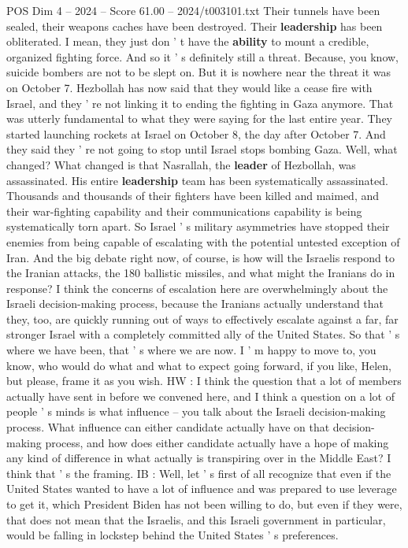 \begin{textsample}{POS Dim 4 – 2024 – Score 61.00 – 2024/t003101.txt}
Their tunnels have been sealed, their weapons caches have been destroyed.
Their \textbf{leadership} has been obliterated.
I mean, they just don ' t have the \textbf{ability} to mount a credible, organized fighting force.
And so it ' s definitely still a threat.
Because, you know, suicide bombers are not to be slept on.
But it is nowhere near the threat it was on October 7.
Hezbollah has now said that they would like a cease fire with Israel, and they ' re not linking it to ending the fighting in Gaza anymore.
That was utterly fundamental to what they were saying for the last entire year.
They started launching rockets at Israel on October 8, the day after October 7.
And they said they ' re not going to stop until Israel stops bombing Gaza.
Well, what changed?
What changed is that Nasrallah, the \textbf{leader} of Hezbollah, was assassinated.
His entire \textbf{leadership} team has been systematically assassinated.
Thousands and thousands of their fighters have been killed and maimed, and their war-fighting capability and their communications capability is being systematically torn apart.
So Israel ' s military asymmetries have stopped their enemies from being capable of escalating with the potential untested exception of Iran.
And the big debate right now, of course, is how will the Israelis respond to the Iranian attacks, the 180 ballistic missiles, and what might the Iranians do in response?
I think the concerns of escalation here are overwhelmingly about the Israeli decision-making process, because the Iranians actually understand that they, too, are quickly running out of ways to effectively escalate against a far, far stronger Israel with a completely committed ally of the United States.
So that ' s where we have been, that ' s where we are now.
I ' m happy to move to, you know, who would do what and what to expect going forward, if you like, Helen, but please, frame it as you wish.
HW : I think the question that a lot of members actually have sent in before we convened here, and I think a question on a lot of people ' s minds is what influence -- you talk about the Israeli decision-making process.
What influence can either candidate actually have on that decision-making process, and how does either candidate actually have a hope of making any kind of difference in what actually is transpiring over in the Middle East?
I think that ' s the framing.
IB : Well, let ' s first of all recognize that even if the United States wanted to have a lot of influence and was prepared to use leverage to get it, which President Biden has not been willing to do, but even if they were, that does not mean that the Israelis, and this Israeli government in particular, would be falling in lockstep behind the United States ' s preferences.

\end{textsample}
